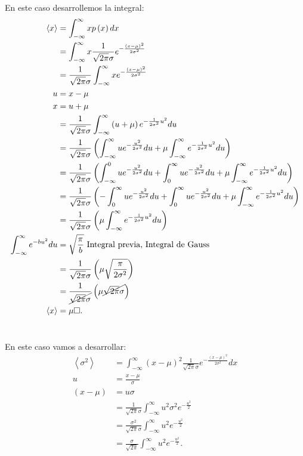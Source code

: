 \documentclass{report}
\begin{document}
En este caso desarrollemos la integral:
\begin{align*}
  \left< x \right> &= \int_{-\infty}^{\infty}x p\left( x \right)dx  \\
  &= \int_{-\infty}^{\infty} x \frac{1}{\sqrt{2\pi}\sigma } e^{- \frac{\left( x - \mu \right)^2 }{2\sigma^2}} \\
  &= \frac{1}{\sqrt{2\pi} \sigma} \int_{-\infty}^{\infty} x e^{- \frac{\left( x - \mu \right)^2}{2 \sigma^2}} \\
  u &= x - \mu \\
  x &= u + \mu \\
  &= \frac{1}{\sqrt{2\pi} \sigma} \int_{-\infty}^{\infty} \left( u + \mu \right) e^{- \frac{1}{2\sigma^2} u^2} du \\
  &= \frac{1}{\sqrt{2\pi} \sigma} \left( \int_{-\infty}^{\infty} u e^{-\frac{u^2}{2\sigma^2}} du + \mu \int_{-\infty}^{\infty} e^{-\frac{1}{2\sigma^2} u^2} du \right)  \\
  &= \frac{1}{\sqrt{2\pi} \sigma}\left( \int_{-\infty}^{0} ue^{-\frac{u^2}{2\sigma^2}}du + \int_{0}^{\infty} ue^{-\frac{u^2}{2\sigma^2}}du +\mu \int_{-\infty}^{\infty} e^{-\frac{1}{2\sigma^2} u^2} du \right)  \\
  &= \frac{1}{\sqrt{2\pi} \sigma}\left( - \int_{0}^{\infty} ue^{-\frac{u^2}{2\sigma^2}}du + \int_{0}^{\infty} ue^{-\frac{u^2}{2\sigma^2}}du +\mu \int_{-\infty}^{\infty} e^{-\frac{1}{2\sigma^2} u^2} du \right)  \\
  &= \frac{1}{\sqrt{2\pi} \sigma}\left(\mu \int_{-\infty}^{\infty} e^{-\frac{1}{2\sigma^2} u^2} du \right)  \\
  \int_{-\infty}^{\infty} e^{-b u^2} du &= \sqrt{\frac{\pi}{b}} \text{ Integral previa, Integral de Gauss}  \\
  &= \frac{1}{\sqrt{2\pi} \sigma}\left( \mu\sqrt{\frac{\pi}{2\sigma^2}}  \right)  \\
  &= \frac{1}{\cancel{\sqrt{2\pi} \sigma}}\left( \mu \cancel{\sqrt{2\pi}\sigma}  \right)  \\
  \left<x \right> &= \mu \square
.\end{align*}

\section{}
En este caso vamos a desarrollar:
\begin{align*}
  \left<\sigma^2 \right> &= \int_{-\infty}^{\infty}\left( x - \mu \right)^2 \frac{1}{\sqrt{2\pi} \sigma} e^{- \frac{\left( x - \mu \right)^2}{2 \sigma^2}} dx \\
  u &= \frac{x - \mu}{\sigma} \\
  \left( x - \mu \right) &= u \sigma \\
  &= \frac{1}{\sqrt{2\pi}\sigma} \int_{-\infty}^{\infty} u^2\sigma^2 e^{- \frac{u^2}{2}} \\
  &= \frac{\sigma^2}{\sqrt{2\pi}\sigma} \int_{-\infty}^{\infty} u^2 e^{- \frac{u^2}{2}}\\
  &= \frac{\sigma}{\sqrt{2\pi}} \int_{-\infty}^{\infty} u^2 e^{- \frac{u^2}{2}}
.\end{align*}
\end{document}
